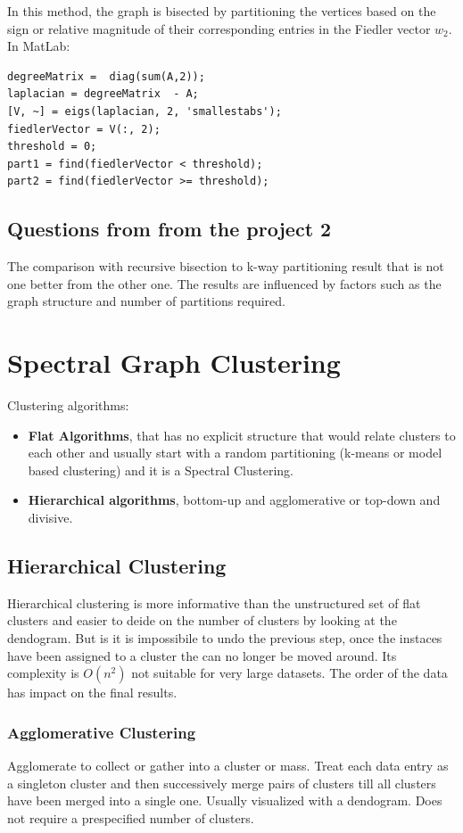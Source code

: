 \documentclass[unicode,11pt,a4paper,oneside,numbers=endperiod,openany]{scrartcl}
\begin{document}
In this method, the graph is bisected by partitioning the vertices based on the sign or relative magnitude of their corresponding entries in the Fiedler vector \( w_2 \).
\newline
In MatLab:
\begin{lstlisting}
degreeMatrix =  diag(sum(A,2));
laplacian = degreeMatrix  - A;
[V, ~] = eigs(laplacian, 2, 'smallestabs');
fiedlerVector = V(:, 2);
threshold = 0;
part1 = find(fiedlerVector < threshold);
part2 = find(fiedlerVector >= threshold);
\end{lstlisting}

\subsection{Questions from from the project 2}
The comparison with recursive bisection to k-way partitioning result that is not one better from the other one. The results are influenced by factors such as the graph structure and number of partitions required.

\section{Spectral Graph Clustering}
Clustering algorithms:
\begin{itemize}
 \item{\textbf{Flat Algorithms}, that has no explicit structure that would relate clusters to each other and usually start with a random partitioning (k-means or model based clustering) and it is a Spectral Clustering.}
 \item{\textbf{Hierarchical algorithms}, bottom-up and agglomerative or top-down and divisive.}
\end{itemize}

\subsection{Hierarchical Clustering}
Hierarchical clustering is more informative than the unstructured set of flat clusters and easier to deide on the number of clusters by looking at the dendogram.\newline
But is it is impossibile to undo the previous step, once the instaces have been assigned to a cluster the can no longer be moved around. Its complexity is $O(n^2)$ not suitable for very large datasets. The order of the data has impact on the final results.
\subsubsection{Agglomerative Clustering}
Agglomerate to collect or gather into a cluster or mass. Treat each data entry as a singleton cluster and then successively merge pairs of clusters till all clusters have been merged into a single one. Usually visualized with a dendogram. Does not require a prespecified number of clusters.
\end{document}
